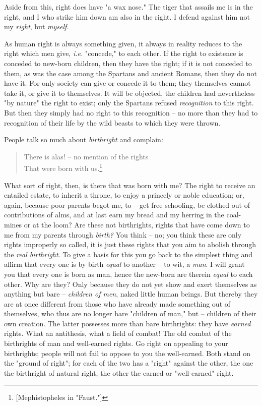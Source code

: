 Aside from this, right does have "{}a wax nose."{} The tiger that assails me 
is in the right, and I who strike him down am also in the right. I defend 
against him not my \textit{right}, but \textit{myself.}

As human right is always something given, it always in reality reduces to the 
right which men give, \textit{i.e.} "{}concede,"{} to each other. If the right 
to existence is conceded to new-born children, then they have the right; if it 
is not conceded to them, as was the case among the Spartans and ancient 
Romans, then they do not have it. For only society can give or concede it to 
them; they themselves cannot take it, or give it to themselves. It will be 
objected, the children had nevertheless "{}by nature"{} the right to exist; 
only the Spartans refused \textit{recognition} to this right. But then they 
simply had no right to this recognition -- no more than they had to 
recognition of their life by the wild beasts to which they were thrown.

People talk so much about \textit{birthright} and complain:

\begin{quotation}

\noindent{} There is alas! -- no mention of the rights\\
 That were born with us.\footnote{[Mephistopheles in "{}Faust."{}]} 
\end{quotation}

\noindent{}What sort of right, then, is there that was born with me? The right 
to receive an entailed estate, to inherit a throne, to enjoy a princely or 
noble education; or, again, because poor parents begot me, to -- get free 
schooling, be clothed out of contributions of alms, and at last earn my bread 
and my herring in the coal-mines or at the loom? Are these not birthrights, 
rights that have come down to me from my parents through \textit{birth?} You 
think -- no; you think these are only rights improperly so called, it is just 
these rights that you aim to abolish through the \textit{real birthright}. To 
give a basis for this you go back to the simplest thing and affirm that every 
one is by birth \textit{equal} to another -- to wit, a \textit{man}. I will 
grant you that every one is born as man, hence the new-born are therein 
\textit{equal} to each other. Why are they? Only because they do not yet show 
and exert themselves as anything but bare -- \textit{children of men}, naked 
little human beings. But thereby they are at once different from those who 
have already made something out of themselves, who thus are no longer bare 
"{}children of man,"{} but -- children of their own creation. The latter 
possesses more than bare birthrights: they have \textit{earned} rights. What 
an antithesis, what a field of combat! The old combat of the birthrights of 
man and well-earned rights. Go right on appealing to your birthrights; people 
will not fail to oppose to you the well-earned. Both stand on the "{}ground of 
right"{}; for each of the two has a "{}right"{} against the other, the one the 
birthright of natural right, the other the earned or "{}well-earned"{} right.

